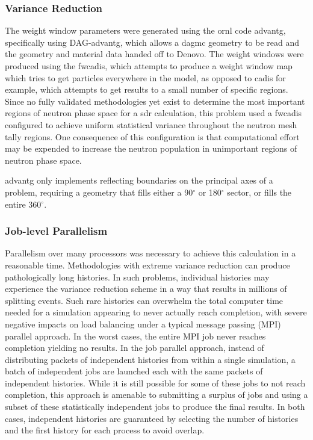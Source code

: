 \documentclass[12pt]{article}
\begin{document}
\subsubsection{Variance Reduction}
The weight window parameters were generated using the \gls{ornl} code
\gls{advantg}, specifically using DAG-\gls{advantg}, which allows a
\gls{dagmc} geometry to be read and the geometry and material data handed off to
Denovo. The weight windows were produced using the \gls{fwcadis},
which attempts to produce a weight window map which tries to get particles
everywhere in the model, as opposed to \gls{cadis} for example, which
attempts to get results to a small number of specific regions.  Since no 
fully validated methodologies yet exist to determine the most important regions of
neutron phase space for a \gls{sdr} calculation, this problem used a \gls{fwcadis}
configured to achieve uniform statistical variance throughout the neutron mesh
tally regions.  One consequence of this configuration is that computational
effort may be expended to increase the neutron population in unimportant regions 
of neutron phase space.

\gls{advantg} only implements reflecting boundaries on the principal axes of a 
problem, requiring a geometry that fills either a 90$^{\circ}$ or 180$^{\circ}$ 
sector, or fills the entire 360$^{\circ}$.


\subsubsection{Job-level Parallelism}
Parallelism over many processors was necessary to achieve this calculation in
a reasonable time. Methodologies with extreme variance reduction can produce
pathologically long histories.  In such problems, individual histories may
experience the variance reduction scheme in a way that results in millions of
splitting events.  Such rare histories can overwhelm the total computer time
needed for a simulation appearing to never actually reach completion, with
severe negative impacts on load balancing under a typical message passing
(MPI) parallel approach.  In the worst cases, the entire MPI job never reaches
completion yielding no results.  In the job parallel approach, instead of
distributing packets of independent histories from within a single simulation,
a batch of independent jobs are launched each with the same packets of
independent histories.  While it is still possible for some of these jobs to
not reach completion, this approach is amenable to submitting a surplus of
jobs and using a subset of these statistically independent jobs to produce the
final results.  In both cases, independent histories are guaranteed by
selecting the number of histories and the first history for each process to
avoid overlap.  
\end{document}
